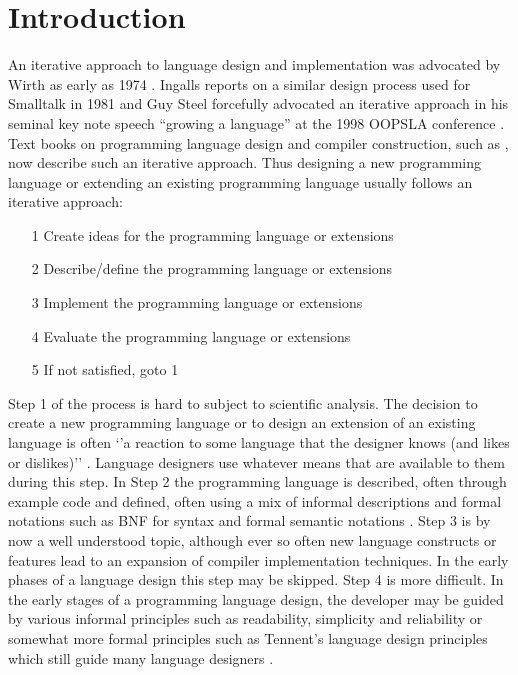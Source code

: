 \documentclass[preprint,10pt]{sigplanconf}
\begin{document}
\section{Introduction}
An iterative approach to language design and implementation was advocated by Wirth as early as 1974 \cite{wirth1974design}.
Ingalls reports on a similar design process used for Smalltalk in 1981 \cite{ingalls1981design} and
Guy Steel forcefully advocated an iterative approach in his seminal key note speech ``growing a language'' at the 1998 OOPSLA conference \cite{steele1999growing}.
Text books on programming language design and compiler construction, such as \cite{watt2000programming}, now describe such an iterative approach.
Thus designing a new programming language or extending an existing programming language usually follows an iterative approach:
\begin{itemize}
\item[1] Create ideas for the programming language or extensions
\item[2] Describe/define the programming language or extensions
\item[3] Implement  the programming language or extensions
\item[4] Evaluate  the programming language or extensions
\item[5] If not satisfied, goto 1
\end{itemize}



Step 1 of the process is hard to subject to scientific analysis. The decision to create a new programming language or to design an extension of an existing language is often `'a reaction to some language that the designer knows (and likes or dislikes)'' \cite{sestoft2012programming}. Language designers use whatever means that are available to them during this step. 
In Step 2 the programming language is described, often through example code and defined, often using a mix of informal descriptions and formal notations such as BNF for syntax and formal semantic notations \cite{watt2000programming}.
Step 3 is by now a well understood topic, although ever so often new language constructs or features lead to an expansion of compiler implementation techniques. In the early phases of a language design this step may be skipped.
Step 4 is more difficult. In the early stages of a programming language design, the developer may be guided by various informal principles such as readability, simplicity and reliability \cite{pratt1984programming,sebesta2012concepts} or somewhat more formal principles such as Tennent's language design principles \cite{tennent1981principles} which still guide many language designers \cite{sestoft2012programming}.
\end{document}
